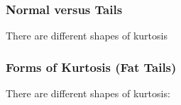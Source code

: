 \documentclass{beamer}
\begin{document}
\begin{frame}
  \frametitle{Normal versus Tails}
  There are different shapes of kurtosis 

\end{frame}


\begin{frame}
  \frametitle{Forms of Kurtosis (Fat Tails)}
  There are different shapes of kurtosis:\\ 
\end{frame}
\end{document}
